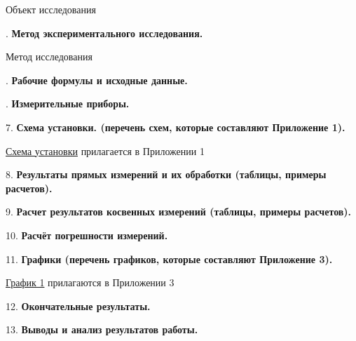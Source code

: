 \documentclass[12pt]{article}
\newcommand{\placeholder}[1]{{\color{magenta}#1}}
\begin{document}
    \placeholder{Объект исследования}

    \mediumvspace

    . \textbf{Метод экспериментального исследования.}

    \placeholder{Метод исследования}

    \mediumvspace

    . \textbf{Рабочие формулы и исходные данные.}

    

    \mediumvspace

    \clearpage

    . \textbf{Измерительные приборы.}

    \smallvspace

    

    \mediumvspace

    7. \textbf{Схема установки. (перечень схем, которые составляют Приложение 1).}

    \hyperlink{schema1}{Схема установки} прилагается в Приложении 1

    \mediumvspace

    8. \textbf{Результаты прямых измерений и их обработки (таблицы, примеры расчетов).}

    

    \mediumvspace

    9. \textbf{Расчет результатов косвенных измерений (таблицы, примеры расчетов).}

    

    \mediumvspace

    10. \textbf{Расчёт погрешности измерений.}

    \mediumvspace

    11. \textbf{Графики (перечень графиков, которые составляют Приложение 3).}

    \hyperlink{diagram1}{График 1} прилагаются в Приложении 3

    \mediumvspace

    12. \textbf{Окончательные результаты.}

    

    \mediumvspace

    13. \textbf{Выводы и анализ результатов работы.}

    

    \clearpage
\end{document}
